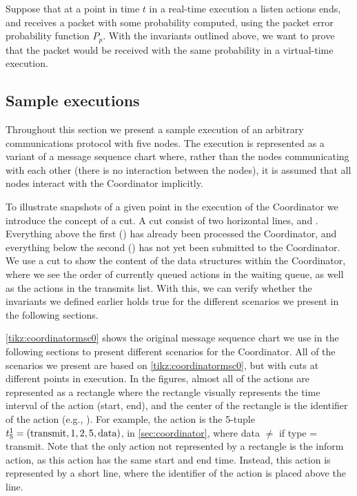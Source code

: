 Suppose that at a point in time $t$ in a real-time execution a listen actions ends, and receives a packet with some probability computed, using the packet error probability function $P_p$. With the invariants outlined above, we want to prove that the packet would be received with the same probability in a virtual-time execution.



\subsection{Sample executions}\label{sec:coordinator-examples}
Throughout this section we present a sample execution of an arbitrary communications protocol with five nodes. The execution is represented as a variant of a message sequence chart where, rather than the nodes communicating with each other (there is no interaction between the nodes), it is assumed that all nodes interact with the Coordinator implicitly. \smallbreak

To illustrate snapshots of a given point in the execution of the Coordinator we introduce the concept of a cut. A cut consist of two horizontal lines, \ProcessedLine and \SubmittedLine. Everything above the first (\ProcessedLine) has already been processed the Coordinator, and everything below the second (\SubmittedLine) has not yet been submitted to the Coordinator. We use a cut to show the content of the data structures within the Coordinator, where we see the order of currently queued actions in the waiting queue, as well as the actions in the transmits list. With this, we can verify whether the invariants we defined earlier holds true for the different scenarios we present in the following sections. \smallbreak

\autoref{tikz:coordinatormsc0} shows the original message sequence chart we use in the following sections to present different scenarios for the Coordinator. All of the scenarios we present are based on \autoref{tikz:coordinatormsc0}, but with cuts at different points in execution. In the figures, almost all of the actions are represented as a rectangle where the rectangle visually represents the time interval of the action (start, end), and the center of the rectangle is the identifier of the action (e.g., ). For example, the action  is the 5-tuple $t^{1}_{5} = (\text{transmit}, 1, 2, 5, \text{data})$, in \autoref{sec:coordinator}, where data $\neq$ \KwNull if type = transmit. Note that the only action not represented by a rectangle is the inform action, as this action has the same start and end time. Instead, this action is represented by a short line, where the identifier of the action is placed above the line.

